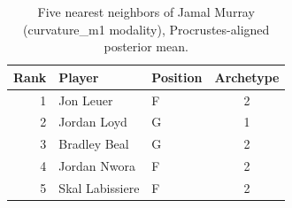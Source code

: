 \begin{table}[htbp]
  \centering\small
  \begin{tabular}{rllc}
    \toprule
    Rank & Player & Position & Archetype \\
    \midrule
    1 & Jon Leuer & F & 2 \\
    2 & Jordan Loyd & G & 1 \\
    3 & Bradley Beal & G & 2 \\
    4 & Jordan Nwora & F & 2 \\
    5 & Skal Labissiere & F & 2 \\
    \bottomrule
  \end{tabular}
  \caption{Five nearest neighbors of Jamal Murray (curvature_m1 modality), Procrustes-aligned posterior mean.}
  \label{tab:Jamal_Murray_neighbors_curvature_m1}
\end{table}


